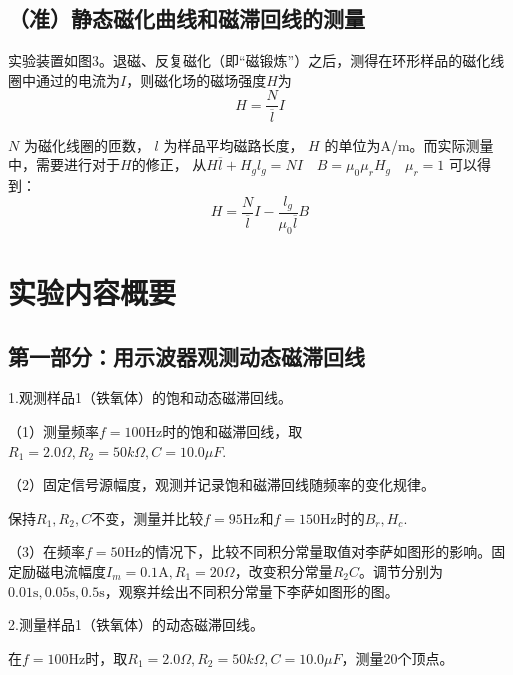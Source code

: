 \documentclass[11pt]{article}
\begin{document}
\subsection{（准）静态磁化曲线和磁滞回线的测量}

实验装置如图3。退磁、反复磁化（即“磁锻炼”）之后，测得在环形样品的磁化线圈中通过的电流为$I$，则磁化场的磁场强度$H$为
\[
    H = \frac{N}{\overline{l}}I
\]

$N$ 为磁化线圈的匝数， $l$ 为样品平均磁路长度， $H$ 的单位为A/m。而实际测量中，需要进行对于$H$的修正，
从$
    H\overline{l} + H_g l_g = NI \quad B = \mu_0\mu_rH_g \quad \mu_r = 1
$
可以得到：
\[
    H = \frac{N}{\overline{l}}I-\frac{l_g}{\mu_0\overline{l}}B
\]



























\section{实验内容概要}

\subsection{第一部分：用示波器观测动态磁滞回线}

1.观测样品1（铁氧体）的饱和动态磁滞回线。

（1）测量频率$f=100\text{Hz}$时的饱和磁滞回线，取$R_1=2.0\Omega,R_2=50k\Omega,C=10.0\mu F$.

（2）固定信号源幅度，观测并记录饱和磁滞回线随频率的变化规律。

保持$R_1,R_2,C$不变，测量并比较$f=95\text{Hz}$和$f=150\text{Hz}$时的$B_r,H_c$.

（3）在频率$f=50\text{Hz}$的情况下，比较不同积分常量取值对李萨如图形的影响。固定励磁电流幅度$I_m=0.1\text{A},R_1=20\Omega$，改变积分常量$R_2C$。调节分别为$0.01\text{s},0.05\text{s},0.5\text{s}$，观察并绘出不同积分常量下李萨如图形的图。


\medskip
2.测量样品1（铁氧体）的动态磁滞回线。

在$f=100\text{Hz}$时，取$R_1=2.0\Omega,R_2=50k\Omega,C=10.0\mu F$，测量20个顶点。
\end{document}
